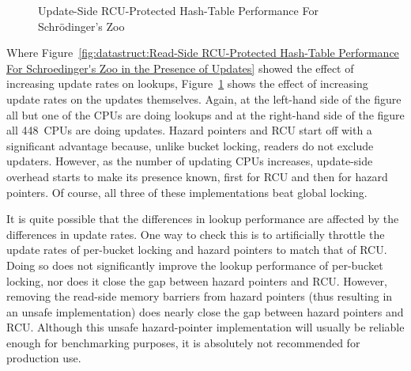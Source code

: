 \begin{figure}[tb]
\centering
{}
\caption{Update-Side RCU-Protected Hash-Table Performance For Schr\"odinger's Zoo}
\label{fig:datastruct:Update-Side RCU-Protected Hash-Table Performance For Schroedinger's Zoo}
\end{figure}

Where
Figure~\ref{fig:datastruct:Read-Side RCU-Protected Hash-Table Performance For Schroedinger's Zoo in the Presence of Updates}
showed the effect of increasing update rates on lookups,
Figure~\ref{fig:datastruct:Update-Side RCU-Protected Hash-Table Performance For Schroedinger's Zoo}
shows the effect of increasing update rates on the updates themselves.
Again, at the left-hand side of the figure all but one of the CPUs are
doing lookups and at the right-hand side of the figure all 448~CPUs are
doing updates.
Hazard pointers and RCU start off with a significant advantage because,
unlike bucket locking, readers do not exclude updaters.
However, as the number of updating CPUs increases, update-side overhead
starts to make its presence known, first for RCU and then for hazard
pointers.
Of course, all three of these implementations beat global locking.

It is quite possible that the differences in lookup performance
are affected by the differences in update rates.
One way to check this is to artificially throttle the update rates of
per-bucket locking and hazard pointers to match that of RCU\@.
Doing so does not significantly improve the lookup performance of
per-bucket locking, nor does it close the gap between hazard pointers
and RCU\@.
However, removing the read-side memory barriers from hazard pointers
(thus resulting in an unsafe implementation) does nearly close the gap
between hazard pointers and RCU\@.
Although this unsafe hazard-pointer implementation will
usually be reliable enough for benchmarking purposes, it is absolutely
not recommended for production use.

